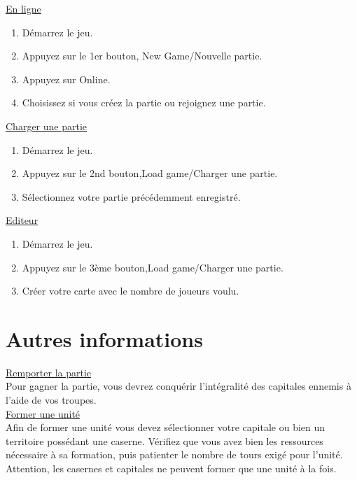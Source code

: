      \underline{En ligne}\\
         \begin{enumerate}
\item Démarrez le jeu.
\item Appuyez sur le 1er bouton, New Game/Nouvelle partie.
\item Appuyez sur Online.
\item Choisissez si vous créez la partie ou rejoignez une partie.\\
\end{enumerate}
    
     \underline{Charger une partie}\\
         \begin{enumerate}
\item Démarrez le jeu.
\item Appuyez sur le 2nd bouton,Load game/Charger une partie.
\item Sélectionnez votre partie précédemment enregistré.
\end{enumerate}


     \underline{Editeur}\\
         \begin{enumerate}
\item Démarrez le jeu.
\item Appuyez sur le 3ème bouton,Load game/Charger une partie.
\item Créer votre carte avec le nombre de joueurs voulu.\\
\end{enumerate}


\section{Autres informations}

 \underline{Remporter la partie}\\
Pour gagner la partie, vous devrez conquérir l'intégralité des capitales ennemis à l'aide de vos troupes.\\
 
 \underline{Former une unité}\\
Afin de former une unité vous devez sélectionner votre capitale ou bien un territoire possédant une caserne. Vérifiez que vous avez bien les ressources nécessaire à sa formation, puis patienter le nombre de tours exigé pour l'unité. Attention, les casernes et capitales ne peuvent former que une unité à la fois.\\
  
